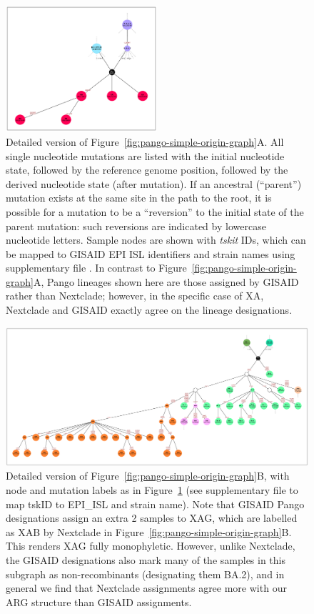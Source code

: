 \documentclass{article}
\begin{document}
\begin{figure} \centering
\includegraphics[width=0.5\textwidth]{figures/Pango_XA_gisaid_large_graph.pdf}
\caption{\label{fig:pango_XA_gisaid_graph}
Detailed version of Figure~\ref{fig:pango-simple-origin-graph}A. All single nucleotide mutations are listed
with the initial nucleotide state, followed by the reference genome position, followed by the derived
nucleotide state (after mutation). If an ancestral (``parent'') mutation exists at the same site in the path
to the root, it is possible for a mutation to be a ``reversion'' to the initial state of the parent mutation:
such reversions are indicated by lowercase nucleotide letters. Sample nodes are shown with \emph{tskit} IDs,
which can be mapped to GISAID EPI ISL identifiers and strain names using supplementary file \protect{}. In contrast to
Figure~\ref{fig:pango-simple-origin-graph}A, Pango lineages shown here are those assigned by GISAID rather
than Nextclade; however, in the specific case of XA, Nextclade and GISAID exactly agree on the lineage designations.
}
\end{figure}

\begin{figure} \centering
\includegraphics[width=\textwidth]{figures/Pango_XAG_gisaid_large_graph.pdf}
\caption{\label{fig:pango_XAG_gisaid_graph}
Detailed version of Figure~\ref{fig:pango-simple-origin-graph}B, with node and mutation labels as in
Figure~\ref{fig:pango_XA_gisaid_graph} (see supplementary file \protect{}
to map tskID to EPI\_ISL and strain name).
Note that GISAID Pango designations assign an extra 2 samples to XAG, which are labelled as XAB
by Nextclade in Figure~\ref{fig:pango-simple-origin-graph}B. This renders XAG fully monophyletic.
However, unlike Nextclade, the GISAID designations also mark many of the samples in this subgraph
as non-recombinants (designating them BA.2), and in general we find that Nextclade assignments
agree more with our ARG structure than GISAID assignments.
}
\end{figure}
\end{document}
